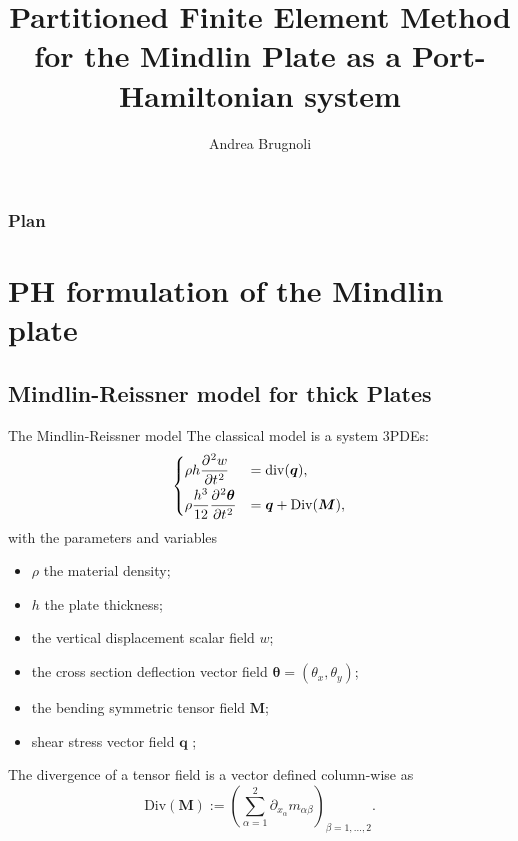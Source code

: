 \documentclass{beamer}
\title[CPDE Oaxaca 2019]{Partitioned Finite Element Method for the Mindlin Plate as a Port-Hamiltonian system}
\author[A. Brugnoli ISAE-SUPAERO]{\small Andrea Brugnoli}
\begin{document}
	
\begin{frame}
	\titlepage
\end{frame}

\begin{frame}
\frametitle{Plan}
\small
\tableofcontents
\normalsize
\end{frame}

\section{PH formulation of the Mindlin plate}
\subsection{Mindlin-Reissner model for thick Plates}

\begin{frame}{The Mindlin-Reissner model}
The classical model is a system 3PDEs:
\begin{equation*}
\begin{cases}
\displaystyle \rho h \diffp[2]{w}{t} &= \mathrm{div}(\bm{q}),  \vspace{1mm}\\
\displaystyle \rho\frac{h^3}{12} \diffp[2]{\bm \theta}{t} &= \bm{q} + \mathrm{Div}(\bm M), \\
\end{cases}
\end{equation*}
with the parameters and variables
\begin{itemize}
	\item $\rho$ the material density; \\
	\item $h$ the plate thickness; \\
	\item the vertical displacement scalar field $w$; \\
	\item the cross section deflection vector field $\bm \theta = (\theta_x, \theta_y)$; \\
	\item the bending symmetric tensor field $\bm{M}$;\\
	\item shear stress vector field $\bm{q}$ ;\\
\end{itemize}
The divergence of a tensor field is a vector defined column-wise as
\begin{equation*}
\mathrm{Div}(\bm M) := \left( \sum_{\alpha = 1}^2 \partial_{x_\alpha} m_{\alpha \beta} \right)_{\beta = 1, \dots, 2}.
\end{equation*}
\end{frame}
\end{document}
